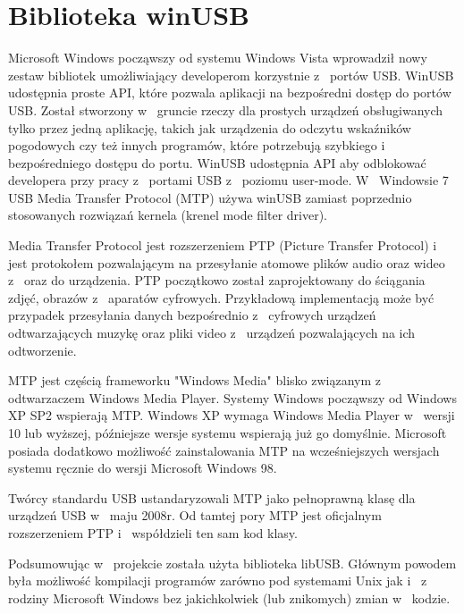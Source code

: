 \documentclass{BscUS}
\begin{document}
\section{Biblioteka winUSB}
Microsoft Windows począwszy od systemu Windows Vista wprowadził nowy zestaw bibliotek umożliwiający developerom korzystnie z~ portów USB. WinUSB udostępnia proste API, które pozwala aplikacji na bezpośredni dostęp do portów USB. Został stworzony w~ gruncie rzeczy dla prostych urządzeń obsługiwanych tylko przez jedną aplikację, takich jak urządzenia do odczytu wskaźników pogodowych czy też innych programów, które potrzebują szybkiego i~ bezpośredniego dostępu do portu. WinUSB udostępnia API aby odblokować developera przy pracy z~ portami USB z~ poziomu user-mode. W~ Windowsie 7 USB Media Transfer Protocol (MTP) używa winUSB zamiast poprzednio stosowanych rozwiązań kernela (krenel mode filter driver).

Media Transfer Protocol jest rozszerzeniem PTP (Picture Transfer Protocol) i~ jest protokołem pozwalającym na przesyłanie atomowe plików audio oraz wideo z~ oraz do urządzenia. PTP początkowo został zaprojektowany do ściągania zdjęć, obrazów z~ aparatów cyfrowych. Przykładową implementacją może być przypadek przesyłania danych bezpośrednio z~ cyfrowych urządzeń odtwarzających muzykę oraz pliki video z~ urządzeń pozwalających na ich odtworzenie.

MTP jest częścią frameworku "Windows Media" blisko związanym z~ odtwarzaczem Windows Media Player. Systemy Windows począwszy od Windows XP SP2 wspierają MTP. Windows XP wymaga Windows Media Player w~ wersji 10 lub wyższej, późniejsze wersje systemu wspierają już go domyślnie. Microsoft posiada dodatkowo możliwość zainstalowania MTP na wcześniejszych wersjach systemu ręcznie do wersji Microsoft Windows 98.

Twórcy standardu USB ustandaryzowali MTP jako pełnoprawną klasę dla urządzeń USB w~ maju 2008r.
Od tamtej pory MTP jest oficjalnym rozszerzeniem PTP i~ współdzieli ten sam kod klasy. \cite{winusbDesc, micrDevAppUSBDev, micrAccUsbDev, micCommWithUsb}
\newline

\indent Podsumowując w~ projekcie została użyta biblioteka libUSB. Głównym powodem była możliwość kompilacji programów zarówno pod systemami Unix jak i~ z~ rodziny Microsoft Windows bez jakichkolwiek (lub znikomych) zmian w~ kodzie.
\end{document}
